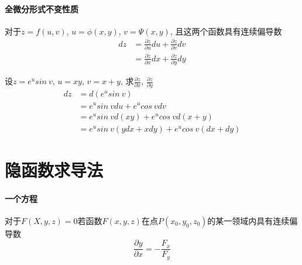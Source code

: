 \documentclass[main.tex]{subfiles}
\begin{document}
\paragraph{全微分形式不变性质} 对于$z = f(u, v)$, $u = \phi (x, y)$, $v = \Psi (x, y)$, 且这两个函数具有连续偏导数
\begin{align*}
    dz &= \frac{\partial z}{\partial u} du + \frac{\partial z}{\partial v} dv \\
       &= \frac{\partial z}{\partial x} dx + \frac{\partial z}{\partial y} dy
\end{align*}

\begin{example}{设$z = e^u sin\ v$, $u = xy$, $v = x + y$, 求$\frac{\partial z}{\partial x}$, $\frac{\partial z}{\partial y}$}
    \begin{align*}
        dz &= d(e^u sin\ v) \\
           &= e^u sin\ v du + e^u cos\ v dv \\
           &= e^u sin\ v d(xy) + e^u cos\ v d(x + y) \\
           &= e^u sin\ v (ydx + xdy) + e^u cos\ v (dx + dy)
    \end{align*}
\end{example}

\section{隐函数求导法}
\paragraph{一个方程} 对于$F(X, y, z) = 0$若函数$F(x, y, z)$在点$P(x_0, y_0, z_0)$的某一领域内具有连续偏导数
\begin{equation}
    \frac{\partial y}{\partial x} = - \frac{F_x}{F_y} \tag{隐函数求导公式}
\end{equation}
\end{document}

